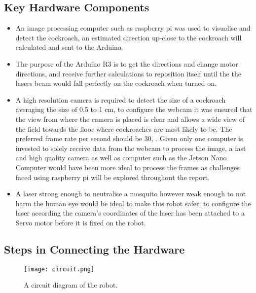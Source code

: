 \documentclass[11pt]{article}
\begin{document}
	\subsection{Key Hardware Components }
	\begin{itemize}
		\item An image processing computer such as raspberry pi was used to visualise and detect the cockroach, an estimated direction up-close to the cockroach will calculated and sent to the Arduino.
		\item The purpose of the Arduino R3 is to get the directions and change motor directions, and receive further calculations to reposition itself until the the lasers beam would fall perfectly on the cockroach when turned on.
		\item 	A high resolution camera is required to detect the size of a cockroach averaging the size of 0.5 to 1 cm, to configure the webcam it was ensured that the view from where the camera is placed is  clear and allows a wide view of the field towards the floor where cockroaches are most likely to be. The preferred frame rate per second should be 30, . Given only one computer is invested to solely receive data from the webcam to process the image, a fast and high quality camera as well as computer  such as the Jetson Nano Computer would have been more ideal to process the frames as challenges faced using raspberry pi will be explored throughout the report.
		
		\item A laser strong enough to neutralise a mosquito however weak enough to not harm the human eye would be ideal to  make this robot safer, to configure the laser according the camera's coordinates of the laser has been attached to a Servo motor before it is fixed on the robot.
	
		
		
	\end{itemize}
	
	\subsection{Steps in Connecting the Hardware}
	
	
		\begin{center}
		
		
		\begin{figure}[H]
			\centering
			\texttt{[image: circuit.png]}
			\caption{A circuit diagram of the robot.  }
			\label{fig:Flowchart}
		\end{figure}
	\end{center}
	
\end{document}
